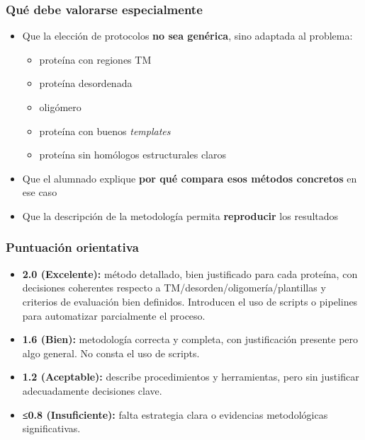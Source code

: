 \documentclass[
  11pt,
  a4paper,
  twoside]{scrreprt}
\providecommand{\tightlist}{%
  \setlength{\itemsep}{0pt}\setlength{\parskip}{0pt}}
\begin{document}
\subsubsection{Qué debe valorarse
especialmente}\label{quuxe9-debe-valorarse-especialmente}

\begin{itemize}
\item
  Que la elección de protocolos \textbf{no sea genérica}, sino adaptada
  al problema:

  \begin{itemize}
  \tightlist
  \item
    proteína con regiones TM
  \item
    proteína desordenada
  \item
    oligómero
  \item
    proteína con buenos \emph{templates}
  \item
    proteína sin homólogos estructurales claros
  \end{itemize}
\item
  Que el alumnado explique \textbf{por qué compara esos métodos
  concretos} en ese caso
\item
  Que la descripción de la metodología permita \textbf{reproducir} los
  resultados
\end{itemize}

\subsubsection{Puntuación orientativa}\label{puntuaciuxf3n-orientativa}

\begin{itemize}
\item
  \textbf{2.0 (Excelente):} método detallado, bien justificado para cada
  proteína, con decisiones coherentes respecto a
  TM/desorden/oligomería/plantillas y criterios de evaluación bien
  definidos. Introducen el uso de scripts o pipelines para automatizar
  parcialmente el proceso.
\item
  \textbf{1.6 (Bien):} metodología correcta y completa, con
  justificación presente pero algo general. No consta el uso de scripts.
\item
  \textbf{1.2 (Aceptable):} describe procedimientos y herramientas, pero
  sin justificar adecuadamente decisiones clave.
\item
  \textbf{≤0.8 (Insuficiente):} falta estrategia clara o evidencias
  metodológicas significativas.
\end{itemize}
\end{document}
